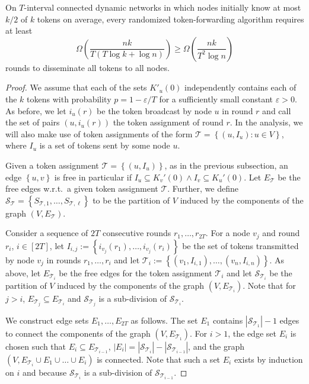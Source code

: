 \documentclass{llncs}
\newcommand{\set}[1]{\left\{#1\right\}}
\newcommand{\eps}{\varepsilon}
\newcommand{\calT}{\mathcal{T}}
\newcommand{\calS}{\mathcal{S}}
\begin{document}
\begin{theorem}
    On $T$-interval connected dynamic networks in which nodes
    initially know at most $k/2$ of $k$ tokens on average, every
    randomized token-forwarding algorithm requires at least
    \[
    \Omega\left( \frac{nk}{T(T\log k + \log n)} \right) \geq 
    \Omega\left( \frac{nk}{T^2 \log n} \right) 
    \]
    rounds to disseminate all tokens to all nodes.
\end{theorem}
\begin{proof}
    We assume that each of the sets $K'_u(0)$ independently contains
    each of the $k$ tokens with probability $p=1-\eps/T$ for a
    sufficiently small constant $\eps>0$. As before, we let $i_u(r)$
    be the token broadcast by node $u$ in round $r$ and call the set
    of pairs $(u,i_u(r))$ the token assignment of round $r$. In the
    analysis, we will also make use of token assignments of the form
    $\calT=\set{(u,I_u): u\in V}$, where $I_u$ is a set of tokens sent by
    some node $u$.
    
    Given a token assignment $\calT=\set{(u,I_u)}$, as in the previous
    subsection, an edge $\set{u,v}$ is free in particular if $I_u\!\subseteq\!
    K_v'(0)\land I_v\!\subseteq\! K_u'(0)$. Let $E_\calT$ be the free edges
    w.r.t.\ a given token assignment $\calT$.  Further, we define
    $\calS_\calT=\set{S_{\calT,1},\dots,S_{\calT,\ell}}$ to be the
    partition of $V$ induced by the components of the graph
    $(V,E_\calT)$.

    Consider a sequence of $2T$ consecutive rounds
    $r_1,\dots,r_{2T}$. For a node $v_j$ and round $r_i$, $i\in[2T]$, let
    $I_{i,j}:=\set{i_{v_j}(r_1),\dots,i_{v_j}(r_i)}$ be the set of
    tokens transmitted by node $v_j$ in rounds $r_1,\dots,r_i$ and let
    $\calT_i:=\set{(v_1,I_{i,1}),\dots,(v_n,I_{i,n})}$. As above, let
    $E_{\calT_i}$ be the free edges for the token assignment $\calT_i$
    and let $\calS_{\calT_i}$ be the partition of $V$ induced by the
    components of the graph $(V,E_{\calT_i})$. Note that for $j>i$,
    $E_{\calT_j}\subseteq E_{\calT_i}$ and $\calS_{\calT_j}$ is a
    sub-division of $\calS_{\calT_i}$.

    We construct edge sets $E_1,\dots,E_{2T}$ as follows. The set
    $E_1$ contains $|\calS_{\calT_1}|-1$ edges to connect the
    components of the graph $(V,E_{\calT_1})$. For $i>1$, the edge set
    $E_i$ is chosen such that $E_i\subseteq E_{\calT_{i-1}}$,
    $|E_i|=|\calS_{\calT_{i}}|-|\calS_{\calT_{i-1}}|$, and the graph
    $(V,E_{\calT_i}\cup E_1\cup\dots\cup E_i)$ is connected. Note that
    such a set $E_i$ exists by induction on $i$ and because
    $\calS_{\calT_i}$ is a sub-division of $\calS_{\calT_{i-1}}$.


\end{proof}
\end{document}
